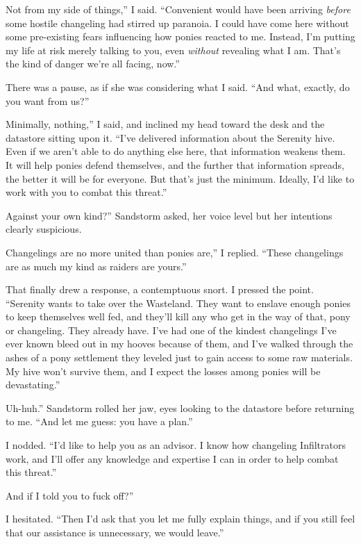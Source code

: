 \leavevmode{}Not from my side of things,” I said. “Convenient would have been arriving \textit{before} some hostile changeling had stirred up paranoia. I could have come here without some pre-existing fears influencing how ponies reacted to me. Instead, I’m putting my life at risk merely talking to you, even \textit{without} revealing what I am. That’s the kind of danger we’re all facing, now.”

There was a pause, as if she was considering what I said. “And what, exactly, do you want from us?”

\leavevmode{}Minimally, nothing,” I said, and inclined my head toward the desk and the datastore sitting upon it. “I’ve delivered information about the Serenity hive. Even if we aren’t able to do anything else here, that information weakens them. It will help ponies defend themselves, and the further that information spreads, the better it will be for everyone. But that’s just the minimum. Ideally, I’d like to work with you to combat this threat.”

\leavevmode{}Against your own kind?” Sandstorm asked, her voice level but her intentions clearly suspicious.

\leavevmode{}Changelings are no more united than ponies are,” I replied. “These changelings are as much my kind as raiders are yours.”

That finally drew a response, a contemptuous snort. I pressed the point. “Serenity wants to take over the Wasteland. They want to enslave enough ponies to keep themselves well fed, and they’ll kill any who get in the way of that, pony or changeling. They already have. I’ve had one of the kindest changelings I’ve ever known bleed out in my hooves because of them, and I’ve walked through the ashes of a pony settlement they leveled just to gain access to some raw materials. My hive won’t survive them, and I expect the losses among ponies will be devastating.”

\leavevmode{}Uh-huh.” Sandstorm rolled her jaw, eyes looking to the datastore before returning to me. “And let me guess: you have a plan.”

I nodded. “I’d like to help you as an advisor. I know how changeling Infiltrators work, and I’ll offer any knowledge and expertise I can in order to help combat this threat.”

\leavevmode{}And if I told you to fuck off?”

I hesitated. “Then I’d ask that you let me fully explain things, and if you still feel that our assistance is unnecessary, we would leave.”

